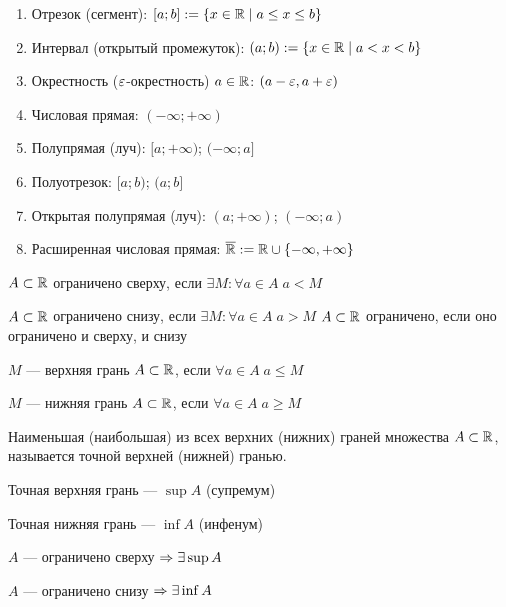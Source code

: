 \documentclass{article}
\begin{document}

\begin{enumerate}
	\item Отрезок (сегмент): $[a;b] := \{x\in\mathbb{R}\;|\;a\leq x\leq b\}$
	\item Интервал (открытый промежуток): $(a;b) := \{x\in\mathbb{R}\;|\;a<x<b\}$
	\item Окрестность ($\varepsilon$-окрестность) $a\in\mathbb{R}$:
	      $(a-\varepsilon,a+\varepsilon)$
	\item Числовая прямая: $(-\infty;+\infty)$
	\item Полупрямая (луч): $[a;+\infty)$; $(-\infty;a]$
	\item Полуотрезок: $[a;b)$; $(a;b]$
	\item Открытая полупрямая (луч): $(a;+\infty)$; $(-\infty;a)$
	\item Расширенная числовая прямая: $\overline{\mathbb{R}}:=\mathbb{R}\cup\{-\infty,+\infty\}$
\end{enumerate}


$A\subset\mathbb{R}$ ограничено сверху, если $\exists M:\forall a\in A\;a<M$

$A\subset\mathbb{R}$ ограничено снизу, если $\exists M:\forall a\in A\;a>M$
$A\subset\mathbb{R}$ ограничено, если оно ограничено и сверху, и снизу


$M$ --- верхняя грань $A\subset\mathbb{R}$, если $\forall a\in A\;a\leq M$

$M$ --- нижняя грань $A\subset\mathbb{R}$, если $\forall a\in A\;a\geq M$

Наименьшая (наибольшая) из всех верхних (нижних) граней множества $A\subset\mathbb{R}$,
называется точной верхней (нижней) гранью.

Точная верхняя грань --- $\sup A$ (супремум)

Точная нижняя грань --- $\inf A$ (инфенум)

\pagebreak

\theorem

$A$ --- ограничено сверху $\Rightarrow \exists \sup A$

$A$ --- ограничено снизу $\Rightarrow \exists \inf A$
\end{document}
